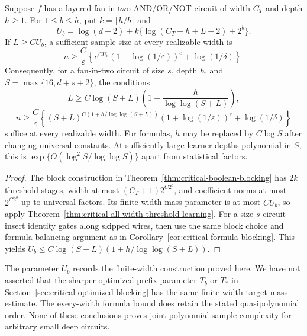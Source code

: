\begin{theorem}
\label{thm:critical-all-width-boolean-blocking}
Suppose $f$ has a layered fan-in-two AND/OR/NOT circuit of width $C_T$
and depth $h\ge1$. For $1\le b\le h$, put $k=\lceil h/b\rceil$ and
\[
 U_b=\log(d+2)+k\{\log(C_T+h+L+2)+2^b\}.
\]
If $L\ge CU_b$, a sufficient sample size at every realizable width is
\[
 n\ge\frac C\varepsilon\left\{
 e^{CU_b}(1+\log(1/\varepsilon))^c+\log(1/\delta)\right\}.
\]
Consequently, for a fan-in-two circuit of size $s$, depth $h$, and
$S=\max\{16,d+s+2\}$, the conditions
\[
 L\ge C\log(S+L)
                \left(1+\frac h{\log\log(S+L)}\right),
\]
\[
 n\ge\frac C\varepsilon\left\{
 (S+L)^{C(1+h/\log\log(S+L))}
 (1+\log(1/\varepsilon))^c+\log(1/\delta)\right\}
\]
suffice at every realizable width. For formulas, $h$ may be replaced
by $C\log S$ after changing universal constants. At sufficiently large
learner depths polynomial in $S$, this is
$\exp\{O(\log^2S/\log\log S)\}$ apart from statistical factors.
\end{theorem}

\begin{proof}
The block construction in Theorem~\ref{thm:critical-boolean-blocking}
has $2k$ threshold stages, width at most
$(C_T+1)2^{C2^b}$, and coefficient norms at most $2^{C2^b}$ up to
universal factors. Its finite-width mass parameter is at most $CU_b$,
so apply Theorem~\ref{thm:critical-all-width-threshold-learning}.
For a size-$s$ circuit insert identity gates along skipped wires,
then use the same block choice and formula-balancing argument as in
Corollary~\ref{cor:critical-formula-blocking}. This yields
$U_b\le C\log(S+L)(1+h/\log\log(S+L))$.
\end{proof}

The parameter $U_b$ records the finite-width construction proved here.
We have not asserted that the sharper optimized-prefix parameter $T_b$
or $T_*$ in Section~\ref{sec:critical-optimized-blocking} has the same
finite-width target-mass estimate. The every-width formula bound does
retain the stated quasipolynomial order. None of these conclusions proves
joint polynomial sample complexity for arbitrary small deep circuits.
